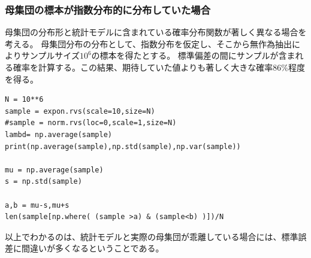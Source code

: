     
\subsubsection{母集団の標本が指数分布的に分布していた場合}
母集団の分布形と統計モデルに含まれている確率分布関数が著しく異なる場合を考える。
母集団分布の分布として、指数分布を仮定し、そこから無作為抽出によりサンプルサイズ$10^6$の標本を得たとする。
標準偏差の間にサンプルが含まれる確率を計算する。この結果、期待していた値よりも著しく大きな確率$86\%$程度を得る。

\begin{lstlisting}
N = 10**6
sample = expon.rvs(scale=10,size=N)
#sample = norm.rvs(loc=0,scale=1,size=N)
lambd= np.average(sample)
print(np.average(sample),np.std(sample),np.var(sample))

mu = np.average(sample)
s = np.std(sample)

a,b = mu-s,mu+s
len(sample[np.where( (sample >a) & (sample<b) )])/N
\end{lstlisting}

以上でわかるのは、統計モデルと実際の母集団が乖離している場合には、標準誤差に間違いが多くなるということである。
